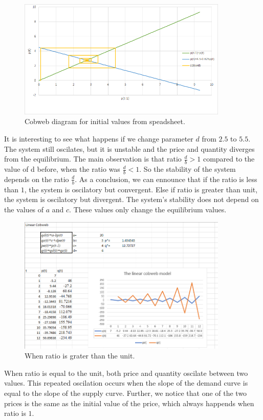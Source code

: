\documentclass[a4paper,12pt]{report}
\begin{document}
\begin{figure}[h]
\caption{Cobweb diagram for initial values from speadsheet.}
\centering
 \includegraphics[width=10cm]{cobwebdiagramfirstexample.png}
\end{figure}
It is interesting to see what happens if we change parameter $d$ from $2.5$ to $5.5$. The system still oscilates, but it is unstable and the price and quantity diverges from the equilibrium. The main observation is that ratio $\frac{d}{b}>1$ compared to the value of d before, when the ratio was $\frac{d}{b}<1$. So the stability of the system depends on the ratio $\frac{d}{b}$. As a conclusion, we can ennounce that if the ratio is less than $1$, the system is oscilatory but convergent. Else if ratio is greater than unit, the system is oscilatory but divergent. The system's stability does not depend on the values of $a$ and $c$. These values only change the equilibrium values.
\begin{figure}[h]
\caption{When ratio is grater than the unit.}
\centering
 \includegraphics[width=10cm]{cobwebratioabove1.PNG}
\end{figure}
When ratio is equal to the unit, both price and quantity oscilate between two values. This repeated oscilation occurs when the slope of the demand curve is equal to the slope of the supply curve. Further, we notice that one of the two prices is the same as the initial value of the price, which always happends when ratio is $1$.
\end{document}
